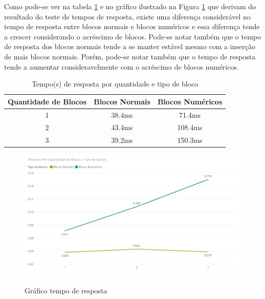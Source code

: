 Como pode-se ver na tabela \ref{table:tempo_resposta} e no gráfico ilustrado na Figura \ref{figura:ttr_grafico} que derivam do resultado do teste de tempos de resposta, existe uma diferença considerável no tempo de resposta entre blocos normais e blocos numéricos e essa diferença tende a crescer considerando o acréscimo de blocos. Pode-se notar também que o tempo de resposta dos blocos normais tende a se manter estável mesmo com a inserção de mais blocos normais. Porém, pode-se notar também que o tempo de resposta tende a aumentar consideravelmente com o acréscimo de blocos numéricos. 

    \begin{table}[H]
        \centering
        \caption{Tempo(s) de resposta por quantidade e tipo de bloco }
        \label{table:tempo_resposta}
        \begin{tabular}{ |c|c|c| } 
         \hline
        Quantidade de Blocos & Blocos Normais & Blocos Numéricos \\
         \hline
        1 & 38.4ms & 71.4ms \\
         \hline
        2 & 43.4ms & 108.4ms\\
         \hline
        3 & 39.2ms & 150.3ms\\    [0.5ex]    
         \hline
        
        \end{tabular}
    \end{table}

\begin{figure}[H]
    \caption{Gráfico tempo de resposta}
    \centering
    \includegraphics[width=14cm]{Imagens/Cap5/ttr_grafico.PNG}
    \label{figura:ttr_grafico}
\end{figure}

